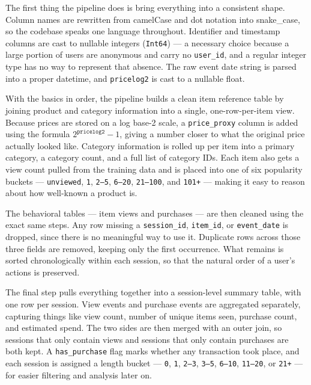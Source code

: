 \documentclass[conference]{IEEEtran}
\begin{document}
The first thing the pipeline does is bring everything into a consistent shape. Column names are rewritten from camelCase and dot notation into snake\_case, so the codebase speaks one language throughout. Identifier and timestamp columns are cast to nullable integers (\texttt{Int64}) --- a necessary choice because a large portion of users are anonymous and carry no \texttt{user\_id}, and a regular integer type has no way to represent that absence. The raw event date string is parsed into a proper datetime, and \texttt{pricelog2} is cast to a nullable float.

With the basics in order, the pipeline builds a clean item reference table by joining product and category information into a single, one-row-per-item view. Because prices are stored on a log base-2 scale, a \texttt{price\_proxy} column is added using the formula $2^{\texttt{pricelog2}} - 1$, giving a number closer to what the original price actually looked like. Category information is rolled up per item into a primary category, a category count, and a full list of category IDs. Each item also gets a view count pulled from the training data and is placed into one of six popularity buckets --- \texttt{unviewed}, \texttt{1}, \texttt{2--5}, \texttt{6--20}, \texttt{21--100}, and \texttt{101+} --- making it easy to reason about how well-known a product is.

The behavioral tables --- item views and purchases --- are then cleaned using the exact same steps. Any row missing a \texttt{session\_id}, \texttt{item\_id}, or \texttt{event\_date} is dropped, since there is no meaningful way to use it. Duplicate rows across those three fields are removed, keeping only the first occurrence. What remains is sorted chronologically within each session, so that the natural order of a user's actions is preserved.

The final step pulls everything together into a session-level summary table, with one row per session. View events and purchase events are aggregated separately, capturing things like view count, number of unique items seen, purchase count, and estimated spend. The two sides are then merged with an outer join, so sessions that only contain views and sessions that only contain purchases are both kept. A \texttt{has\_purchase} flag marks whether any transaction took place, and each session is assigned a length bucket --- \texttt{0}, \texttt{1}, \texttt{2--3}, \texttt{3--5}, \texttt{6--10}, \texttt{11--20}, or \texttt{21+} --- for easier filtering and analysis later on.
\end{document}
